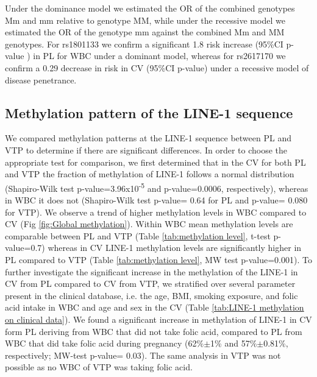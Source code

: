 \documentclass[10pt,letterpaper]{article}
\begin{document}
Under the dominance model we estimated the OR of the combined genotypes Mm and mm relative to genotype MM, while under the recessive model we estimated the OR of the genotype mm against the combined Mm and MM genotypes. For rs1801133 we confirm a significant 1.8 risk increase (95\%CI p-value ) in PL for WBC under a dominant model, whereas for rs2617170 we confirm a 0.29 decrease in risk in CV (95\%CI p-value) under a recessive model of disease penetrance.

\subsection*{Methylation pattern of the LINE-1 sequence}
We compared methylation patterns at the LINE-1 sequence between PL and VTP to determine if there are significant differences. In order to choose the appropriate test for comparison, we first determined that in the CV for both PL and VTP the fraction of methylation of LINE-1 follows a normal distribution  (Shapiro-Wilk test p-value=3.96x10\textsuperscript{-5} and p-value=0.0006, respectively), whereas in WBC it does not (Shapiro-Wilk test p-value= 0.64 for PL and  p-value= 0.080 for VTP). We observe a trend of higher methylation levels in WBC compared to CV (Fig \ref{fig:Global methylation}). Within WBC mean methylation levels are comparable between PL and VTP (Table \ref{tab:methylation level}, t-test p-value=0.7) whereas in CV LINE-1 methylation levels are significantly higher in PL compared to VTP (Table \ref{tab:methylation level}, MW test p-value=0.001).  
\noindent To further investigate the significant increase in the methylation of the LINE-1 in CV from PL compared to CV from VTP, we stratified over several parameter present in the clinical database, i.e. the  age, BMI, smoking exposure, and folic acid intake in WBC and age and sex in the CV (Table \ref{tab:LINE-1 methylation on clinical data}). We found a significant increase in methylation of LINE-1 in CV form PL deriving from WBC that did not take folic acid, compared to PL from WBC that did take folic acid during pregnancy (62\%$\pm$1\% and 57\%$\pm$0.81\%, respectively; MW-test p-value= 0.03). The same analysis in VTP was not possible as no WBC of VTP was taking folic acid.
\end{document}
